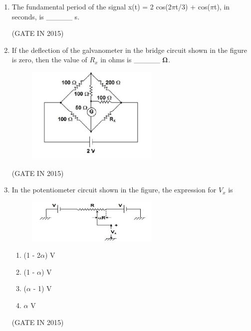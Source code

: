 \documentclass[journal]{IEEEtran}
\begin{document}
\begin{enumerate}
\begin{multicols}{4}
\begin{enumerate}
\item $1 - (1 - \delta)^M$
\item $\delta^M$
\item $(1 - \delta^M)$
\item $(1 - \delta)^M$
\end{enumerate}
  \end{multicols} \hfill(GATE IN 2015)

\item The fundamental period of the signal x(t) = 2 cos(2$\pi$t/3) + cos($\pi$t), in seconds, is \_\_\_\_\_ s.

\hfill(GATE IN 2015)

\item If the deflection of the galvanometer in the bridge circuit shown in the figure is zero, then the value of $R_x$ in ohms is \_\_\_\_\_ $\ohm$.
\begin{figure}[H]
    \centering
      \includegraphics[width=0.6\textwidth]{29.png} 
      \caption{}
    \label{fig:fig29} 
\end{figure}
 \hfill(GATE IN 2015)

\item In the potentiometer circuit shown in the figure, the expression for $V_x$ is
\begin{figure}[H]
    \centering
      \includegraphics[width=0.6\textwidth]{30.png} 
      \caption{}
    \label{fig:fig30} 
\end{figure}
\begin{multicols}{4}
\begin{enumerate}
\item (1 - 2$\alpha$) V
\item (1 - $\alpha$) V
\item ($\alpha$ - 1) V
\item $\alpha$ V
\end{enumerate}
  \end{multicols} \hfill(GATE IN 2015)


\end{enumerate}
\end{document}
